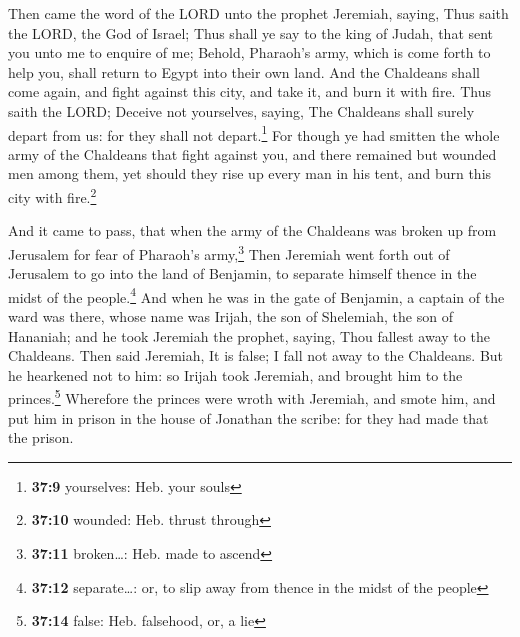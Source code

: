  Then came the word of the LORD unto the prophet Jeremiah,
saying,  Thus saith the LORD, the God of Israel; Thus
shall ye say to the king of Judah, that sent you unto me to enquire of
me; Behold, Pharaoh's army, which is come forth to help you, shall
return to Egypt into their own land.  And the Chaldeans
shall come again, and fight against this city, and take it, and burn it
with fire.  Thus saith the LORD; Deceive not yourselves,
saying, The Chaldeans shall surely depart from us: for they shall not
depart.\footnote{\textbf{37:9} yourselves: Heb. your souls}
 For though ye had smitten the whole army of the
Chaldeans that fight against you, and there remained but wounded men
among them, yet should they rise up every man in his tent, and burn this
city with fire.\footnote{\textbf{37:10} wounded: Heb. thrust through}

 And it came to pass, that when the army of the Chaldeans
was broken up from Jerusalem for fear of Pharaoh's army,\footnote{\textbf{37:11}
  broken\ldots: Heb. made to ascend}  Then Jeremiah went
forth out of Jerusalem to go into the land of Benjamin, to separate
himself thence in the midst of the people.\footnote{\textbf{37:12}
  separate\ldots: or, to slip away from thence in the midst of the
  people}  And when he was in the gate of Benjamin, a
captain of the ward was there, whose name was Irijah, the son of
Shelemiah, the son of Hananiah; and he took Jeremiah the prophet,
saying, Thou fallest away to the Chaldeans.  Then said
Jeremiah, It is false; I fall not away to the Chaldeans. But he
hearkened not to him: so Irijah took Jeremiah, and brought him to the
princes.\footnote{\textbf{37:14} false: Heb. falsehood, or, a lie}
 Wherefore the princes were wroth with Jeremiah, and
smote him, and put him in prison in the house of Jonathan the scribe:
for they had made that the prison.

